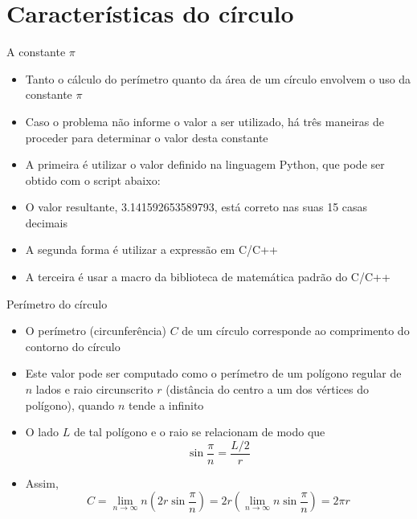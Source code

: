\section{Características do círculo}

\begin{frame}[fragile]{A constante $\pi$}

    \begin{itemize}
        \item Tanto o cálculo do perímetro quanto da área de um círculo envolvem o uso da 
            constante $\pi$
        \pause

        \item Caso o problema não informe o valor a ser utilizado, há três maneiras de proceder 
            para determinar o valor desta constante
        \pause

        \item A primeira é utilizar o valor definido na linguagem Python, que pode ser obtido com 
            o script abaixo:

        \pause

        \item O valor resultante, 3.141592653589793, está correto nas suas 15 casas decimais
        \pause

        \item A segunda forma é utilizar a expressão  em C/C++
        \pause

        \item A terceira é usar a macro  da biblioteca de matemática padrão do
            C/C++
    \end{itemize}

\end{frame}

\begin{frame}[fragile]{Perímetro do círculo}

    \begin{itemize}
        \item O perímetro (circunferência) $C$ de um círculo corresponde ao comprimento do contorno do círculo 
        \pause

        \item Este valor pode ser computado como o perímetro de um polígono regular de $n$ lados e
            raio circunscrito $r$ (distância do centro a um dos vértices do polígono), 
            quando $n$ tende a infinito
        \pause

        \item O lado $L$ de tal polígono e o raio se relacionam de modo que
        \[
            \sin \frac{\pi}{n} = \frac{L/2}{r} 
        \]
        \pause

        \item Assim,
        \[
            C = \lim_{n \to \infty} n\left(2r\sin \frac{\pi}{n}\right) 
            = 2r \left(\lim_{n \to \infty} n\sin \frac{\pi}{n}\right)
            = 2\pi r
        \]

    \end{itemize}

\end{frame}

